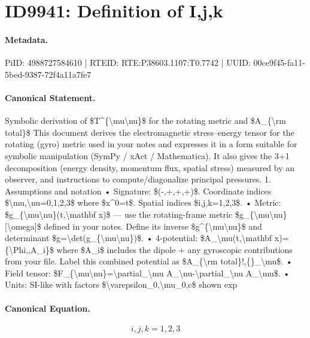 \section*{ID9941: Definition of I,j,k}
\paragraph{Metadata.}
PiID: 4988727584610 | RTEID: RTE:P38603.1107:T0.7742 | UUID: 00ce9f45-fa11-5bed-9387-72f4a11a7fe7

\paragraph{Canonical Statement.}
Symbolic derivation of \$T\textasciicircum{}\{\textbackslash{}mu\textbackslash{}nu\}\$ for the rotating metric and \$A\_\{\textbackslash{}rm total\}\$ This document derives the electromagnetic stress–energy tensor for the rotating (gyro) metric used in your notes and expresses it in a form suitable for symbolic manipulation (SymPy / xAct / Mathematica). It also gives the 3+1 decomposition (energy density, momentum flux, spatial stress) measured by an observer, and instructions to compute/diagonalize principal pressures. 1. Assumptions and notation • Signature: \$(-,+,+,+)\$. Coordinate indices \$\textbackslash{}mu,\textbackslash{}nu=0,1,2,3\$ where \$x\textasciicircum{}0=t\$. Spatial indices \$i,j,k=1,2,3\$. • Metric: \$g\_\{\textbackslash{}mu\textbackslash{}nu\}(t,\textbackslash{}mathbf x)\$ — use the rotating-frame metric \$g\_\{\textbackslash{}mu\textbackslash{}nu\}[\textbackslash{}omega]\$ defined in your notes. Define its inverse \$g\textasciicircum{}\{\textbackslash{}mu\textbackslash{}nu\}\$ and determinant \$g=\textbackslash{}det(g\_\{\textbackslash{}mu\textbackslash{}nu\})\$. • 4-potential: \$A\_\textbackslash{}mu(t,\textbackslash{}mathbf x)=\{\textbackslash{}Phi,,A\_i\}\$ where \$A\_i\$ includes the dipole + any gyroscopic contributions from your file. Label this combined potential as \$A\_\{\textbackslash{}rm total\}!,\{\}\_\textbackslash{}mu\$. • Field tensor: \$F\_\{\textbackslash{}mu\textbackslash{}nu\}=\textbackslash{}partial\_\textbackslash{}mu A\_\textbackslash{}nu-\textbackslash{}partial\_\textbackslash{}nu A\_\textbackslash{}mu\$. • Units: SI-like with factors \$\textbackslash{}varepsilon\_0,\textbackslash{}mu\_0,c\$ shown exp

\paragraph{Canonical Equation.}
\[
i,j,k=1,2,3
\]

